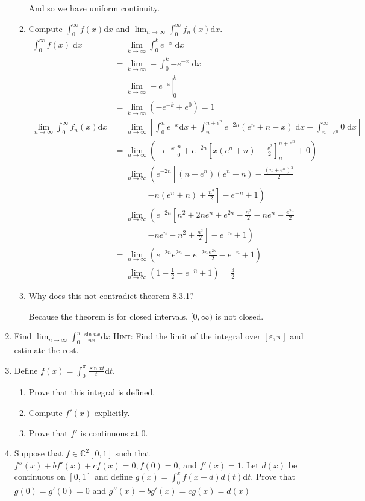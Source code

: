 \documentclass[letterpaper]{article}
\begin{document}
\begin{enumerate}
\begin{enumerate}
  And so we have uniform continuity.
  \item
  Compute $\displaystyle \int_0^\infty{f(x)\mathrm{d}x}$ and $\displaystyle \lim_{n\to\infty}\int_0^\infty{f_n(x)\mathrm{d}x}$.
  \begin{align*}
    \int_0^\infty{f(x)\;\mathrm{d}x}
    &=\lim_{k\to\infty}\int_0^k{e^{-x}\;\mathrm{d}x}\\
    &=\lim_{k\to\infty}-\int_0^k{-e^{-x}\;\mathrm{d}x}\\
    &=\left.\lim_{k\to\infty}-e^{-x}\right\rvert_0^k\\
    &=\lim_{k\to\infty}\left(-e^{-k}+e^{0}\right)=1\\
    \lim_{n\to\infty}\int_0^\infty{f_n(x)\mathrm{d}x}
    &=\lim_{n\to\infty}\left[\int_0^n{e^{-x}\mathrm{d}x}+\int_n^{n+e^n}{e^{-2n}(e^n+n-x)\;\mathrm{d}x}+\int_{n+e^n}^\infty{0\;\mathrm{d}x}\right]\\
    &=\lim_{n\to\infty}\left(\left.-e^{-x}\right\rvert_0^n+e^{-2n}\left[x(e^{n}+n)-\frac{x^2}{2}\right]_n^{n+e^n}+0\right)\\
    &=\lim_{n\to\infty}\left(e^{-2n}\left[(n+e^n)(e^{n}+n)-\frac{(n+e^n)^2}{2}\right.\right.\\&\qquad\qquad\left.\left.-n(e^{n}+n)+\frac{n^2}{2}\right]-e^{-n}+1\right)\\
    &=\lim_{n\to\infty}\left(e^{-2n}\left[n^2+2ne^n+e^{2n}-\frac{n^2}{2}-ne^n-\frac{e^{2n}}{2}\right.\right.\\&\qquad\qquad\left.\left.-ne^{n}-n^2+\frac{n^2}{2}\right]-e^{-n}+1\right)\\
    &=\lim_{n\to\infty}\left(e^{-2n}e^{2n}-e^{-2n}\frac{e^{2n}}{2}-e^{-n}+1\right)\\
    &=\lim_{n\to\infty}\left(1-\frac{1}{2}-e^{-n}+1\right)=\frac{3}{2}
  \end{align*}
  \item Why does this not contradict theorem 8.3.1?

  Because the theorem is for closed intervals. $[0,\infty)$ is not closed.
  \end{enumerate}
\setcounter{enumi}{3}
\item
Find $\displaystyle \lim_{n\to\infty}\int_0^\pi{\frac{\sin nx}{nx}\mathrm{d}x}$ {\scshape Hint:} Find the limit of the integral over $[\varepsilon,\pi]$ and estimate the rest.
\item
Define $\displaystyle f(x)=\int_0^\pi{\frac{\sin xt}{t}\mathrm{d}t}$.
  \begin{enumerate}
  \item
  Prove that this integral is defined.
  \item
  Compute $f'(x)$ explicitly.
  \item
  Prove that $f'$ is continuous at 0.
  \end{enumerate}
\setcounter{enumi}{7}
\item
Suppose that $f\in \mathbb{C}^2[0,1]$ such that $f''(x)+bf'(x)+cf(x)=0, f(0)=0$, and $f'(x)=1$. Let $d(x)$ be continuous on $[0,1]$ and define $g(x)=\int_0^x{f(x-d)d(t)\mathrm{d}t}$. Prove that $g(0)=g'(0)=0$ and $g''(x)+bg'(x)=cg(x)=d(x)$
\end{enumerate}
\end{document}
